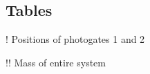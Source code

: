 \begin{landscape}

\subsection{Tables}

\begin{table}[H]
\captionsetup{font=Large}
\caption{Known values}
\centering
\begin{threeparttable}
\begin{tablenotes}\normalsize
	\item[!] Positions of photogates 1 and 2
	\item[!!] Mass of entire system
\end{tablenotes}
\end{threeparttable}
\label{tab:knownsTab}
\end{table}
\vspace{-0.5cm}


\end{landscape}
